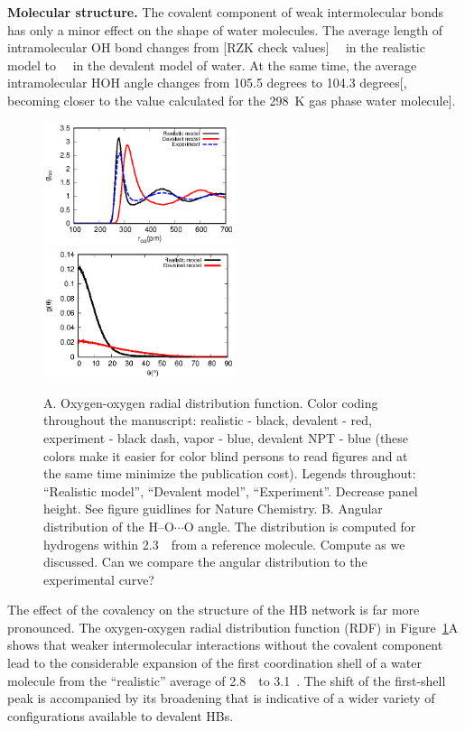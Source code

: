 \documentclass[aps,prl,reprint,amsmath,amssymb]{revtex4-1}
\begin{document}
\textbf{Molecular structure.} The covalent component of weak intermolecular bonds has only a minor effect on the shape of water molecules. The average length of intramolecular OH bond changes from [RZK check values] \old~\Ang\ in the realistic model to \old~\Ang\ in the devalent model of water. At the same time, the average intramolecular HOH angle changes from 105.5 degrees to 104.3 degrees[, becoming closer to the value calculated for the 298~K gas phase water molecule].

\begin{figure}
\includegraphics[width=0.5\textwidth]{new_rdf}
\includegraphics[width=0.5\textwidth]{new_adf}
\caption{A. Oxygen-oxygen radial distribution function. \new Color coding throughout the manuscript: realistic - black, devalent - red, experiment - black dash, vapor - blue, devalent NPT - blue (these colors make it easier for color blind persons to read figures and at the same time minimize the publication cost). Legends throughout: ``Realistic model'', ``Devalent model'', ``Experiment''. Decrease panel height. See figure guidlines for Nature Chemistry. \old B. Angular distribution of the H--O$\cdots$O angle. The distribution is computed for hydrogens within 2.3~\Ang\ from a reference molecule. \new Compute as we discussed. Can we compare the angular distribution to the experimental curve? \old} \label{Fig:RDF}
\end{figure}

The effect of the covalency on the structure of the HB network is far more pronounced. The oxygen-oxygen radial distribution function (RDF) in Figure~\ref{Fig:RDF}A shows that weaker intermolecular interactions without the covalent component lead to the considerable expansion of the first coordination shell of a water molecule from the ``realistic'' average of 2.8~\Ang\ to 3.1~\Ang. The shift of the first-shell peak is accompanied by its broadening that is indicative of a wider variety of configurations available to devalent HBs. 
\end{document}
